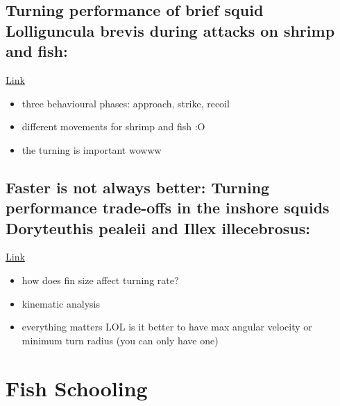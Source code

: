 \documentclass[12pt]{article}
\begin{document}
\subsection{Turning performance of brief squid Lolliguncula brevis during attacks on shrimp and fish: \cite{jastrebsky}}
\href{https://doi.org/10.1242/jeb.144261}{Link}
\begin{itemize}
    \item three behavioural phases: approach, strike, recoil
    \item different movements for shrimp and fish :O
    \item the turning is important wowww
\end{itemize}

\subsection{Faster is not always better: Turning performance trade-offs in the inshore squids Doryteuthis pealeii and Illex illecebrosus: \cite{ganley}}
\href{https://doi.org/10.1016/j.jembe.2023.151913}{Link}
\begin{itemize}
    \item how does fin size affect turning rate?
    \item kinematic analysis
    \item everything matters LOL is it better to have max angular velocity or minimum turn radius (you can only have one)
\end{itemize}



\section{Fish Schooling}
\end{document}
